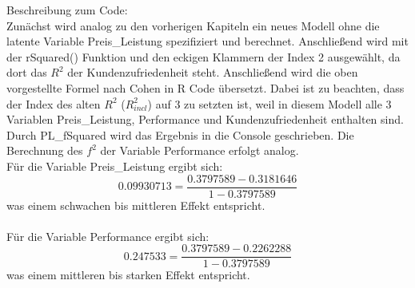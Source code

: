 \documentclass{article}\usepackage[]{graphicx}\usepackage[]{color}
\begin{document}
Beschreibung zum Code:\\
Zunächst wird analog zu den vorherigen Kapiteln ein neues Modell ohne die latente Variable Preis\_Leistung spezifiziert und berechnet. Anschließend wird mit der rSquared() Funktion und den eckigen Klammern der Index 2 ausgewählt, da dort das $R^{2}$ der Kundenzufriedenheit steht. Anschließend wird die oben vorgestellte Formel nach Cohen in R Code übersetzt. Dabei ist zu beachten, dass der Index des alten $R^{2}$ ($R^{2}_{incl}$) auf 3 zu setzten ist, weil in diesem Modell alle 3 Variablen Preis\_Leistung, Performance und Kundenzufriedenheit enthalten sind. Durch PL\_fSquared wird das Ergebnis in die Console geschrieben. Die Berechnung des $f^{2}$ der Variable Performance erfolgt analog.
\\
Für die Variable Preis\_Leistung ergibt sich:
\begin{equation}
0.09930713 = \frac{0.3797589-0.3181646}{1-0.3797589}
\end{equation}
was einem schwachen bis mittleren Effekt entspricht.\\
\\
Für die Variable Performance ergibt sich:
\begin{equation}
0.247533 = \frac{0.3797589-0.2262288}{1-0.3797589}
\end{equation}
was einem mittleren bis starken Effekt entspricht.
\end{document}
